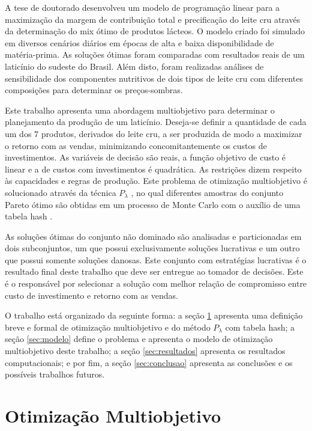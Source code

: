 \documentclass [11pt]{articleSBPO}
\begin{document}
A tese de doutorado \cite{meneghini2013} desenvolveu um modelo de programação linear para a maximização da margem de contribuição total e precificação do leite cru através da determinação do mix ótimo de produtos lácteos. O modelo criado foi simulado em diversos cenários diários em épocas de alta e baixa disponibilidade de matéria-prima. As soluções ótimas foram comparadas com resultados reais de um laticínio do sudeste do Brasil. Além disto, foram realizadas análises de sensibilidade dos componentes nutritivos de dois tipos de leite cru com diferentes composições para determinar os preços-sombras. 

Este trabalho apresenta uma abordagem multiobjetivo para determinar o planejamento da produção de um laticínio. Deseja-se definir a quantidade de cada um dos $ 7 $ produtos, derivados do leite cru, a ser produzida de modo a maximizar o retorno com as vendas, minimizando concomitantemente os custos de investimentos. As variáveis de decisão são reais, a função objetivo de custo é linear e a de custos com investimentos é quadrática. As restrições dizem respeito às capacidades e regras de produção. Este problema de otimização multiobjetivo é solucionado através da técnica $ P_{\lambda} $ \cite{takahashi2007otimizacao}, no qual diferentes amostras do conjunto Pareto ótimo são obtidas em um processo de Monte Carlo \cite{doucet2001introduction} com o auxílio de uma tabela hash \cite{cormen2001introduction}.

As soluções ótimas do conjunto não dominado são analisadas e particionadas em dois subconjuntos, um que possui exclusivamente soluções lucrativas e um outro que possui somente soluções danosas. Este conjunto com estratégias lucrativas é o resultado final deste trabalho que deve ser entregue ao tomador de decisões. Este é o responsável por selecionar a solução com melhor relação de compromisso entre custo de investimento e retorno com as vendas.

O trabalho está organizado da seguinte forma: a seção \ref{sec:otmulti} apresenta uma definição breve e formal de otimização multiobjetivo e do método $ P_\lambda $ com tabela hash; a seção \ref{sec:modelo} define o problema e apresenta o modelo de otimização multiobjetivo deste trabalho; a seção \ref{sec:resultados} apresenta os resultados computacionais; e por fim, a seção \ref{sec:conclusao} apresenta as conclusões e os possíveis trabalhos futuros.


\section{Otimização Multiobjetivo}
\label{sec:otmulti}
\end{document}

